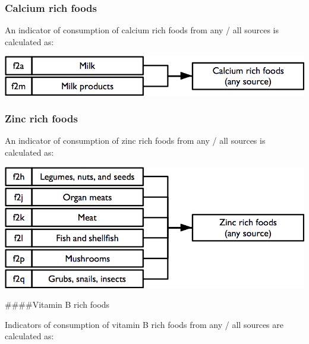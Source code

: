 \documentclass[12pt,a4paper]{book}
\theoremstyle{definition}
\theoremstyle{definition}
\theoremstyle{definition}
\theoremstyle{remark}
\begin{document}
\hypertarget{calcium-rich-foods}{%
\subsubsection{Calcium rich foods}\label{calcium-rich-foods}}

An indicator of consumption of calcium rich foods from any / all sources
is calculated as:

\begin{center}\includegraphics{figures/indicators12} \end{center}

\hypertarget{zinc-rich-foods}{%
\subsubsection{Zinc rich foods}\label{zinc-rich-foods}}

An indicator of consumption of zinc rich foods from any / all sources is
calculated as:

\begin{center}\includegraphics{figures/indicators13} \end{center}

\#\#\#\#Vitamin B rich foods

Indicators of consumption of vitamin B rich foods from any / all sources
are calculated as:
\end{document}
